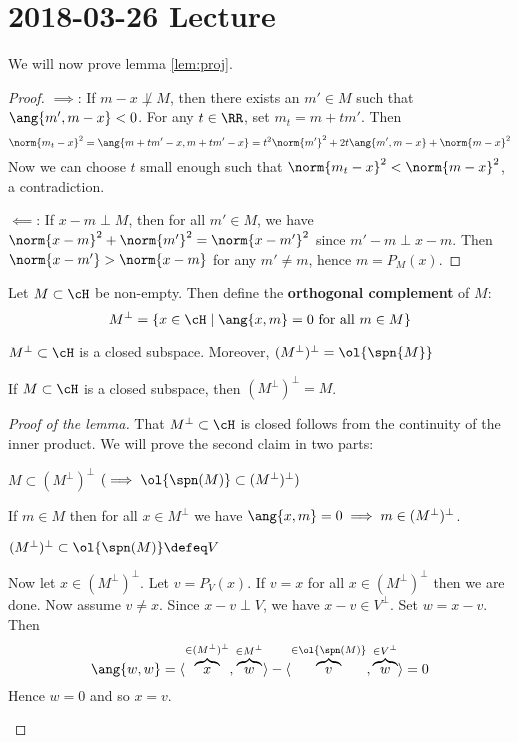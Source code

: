 \section{2018-03-26 Lecture}

We will now prove lemma \ref{lem:proj}.

\begin{proof}
	$\implies$: If $m-x \not\perp M$, then there exists an $m' \in M$ such that $\ang{m',m-x}<0$.
	For any $t \in \RR$, set $m_t = m+tm'$.
	Then
	\[\norm{m_t-x}^2 = \ang{m+tm'-x,m+tm'-x} = t^2\norm{m'}^2 + 2t\ang{m',m-x}+\norm{m-x}^2\]
	Now we can choose $t$ small enough such that $\norm{m_t-x}^2 < \norm{m-x}^2$, a contradiction.
	
	$\impliedby$: If $x-m \perp M$, then for all $m' \in M$, we have $\norm{x-m}^2 + \norm{m'}^2 = \norm{x-m'}^2$ since $m'-m \perp x-m$.
	Then $\norm{x-m'}>\norm{x-m}$ for any $m' \neq m$, hence $m = P_M(x)$.
\end{proof}

\begin{defn}
	Let $M \subset \cH$ be non-empty.
	Then define the \textbf{orthogonal complement} of $M$:
	\[M^\perp = \{x \in \cH \mid \ang{x,m}=0 \text{ for all } m \in M\}\]
\end{defn}

\begin{lem}
	$M^\perp \subset \cH$ is a closed subspace.
	Moreover, $(M^\perp)^\perp = \ol{\spn{M}}$
\end{lem}

\begin{cor}
	If $M \subset \cH$ is a closed subspace, then $(M^\perp)^\perp=M$.
\end{cor}

\begin{proof}[Proof of the lemma]
	That $M^\perp \subset \cH$ is closed follows from the continuity of the inner product.
	We will prove the second claim in two parts:
	\begin{enum}
		\io $M \subset (M^\perp)^\perp$ $(\implies \ol{\spn(M)} \subset (M^\perp)^\perp)$
		\par If $m \in M$ then for all $x \in M^\perp$ we have $\ang{x,m}=0 \implies m \in (M^\perp)^\perp$.
		
		\io $(M^\perp)^\perp \subset \ol{\spn(M)} \defeq V$
		\par Now let $x \in (M^\perp)^\perp$.
		Let $v = P_V(x)$.
		If $v = x$ for all $x \in (M^\perp)^\perp$ then we are done.
		Now assume $v \neq x$.
		Since $x-v \perp V$, we have $x-v \in V^\perp$.
		Set $w=x-v$.
		Then
		\[\ang{w,w}= \langle \overbrace{x}^{\in (M^\perp)^\perp},\overbrace{w}^{\in M^\perp} \rangle - \langle \overbrace{v}^{\in \ol{\spn(M)}},\overbrace{w}^{\in V^\perp} \rangle = 0\]
		Hence $w=0$ and so $x=v$.
	\end{enum}
\end{proof}

